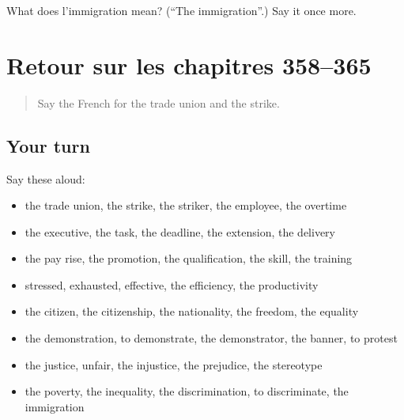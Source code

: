 \begin{tcolorbox}[breakable,colback=teal!4,colframe=teal!35!black,title={Before you move on}]
What does l'immigration mean? (\textquotedblleft{}The immigration\textquotedblright{}.) Say it once more.
\end{tcolorbox}
\section[(dialogue)]{Retour sur les chapitres 358–365}

\label{lesson:FR-R365-revision-358-365}



\begin{quote}
Say the French for the trade union and the strike.
\end{quote}

\subsection*{Your turn}
Say these aloud:

\begin{itemize}
\raggedright
  \item the trade union, the strike, the striker, the employee, the overtime
  \item the executive, the task, the deadline, the extension, the delivery
  \item the pay rise, the promotion, the qualification, the skill, the training
  \item stressed, exhausted, effective, the efficiency, the productivity
  \item the citizen, the citizenship, the nationality, the freedom, the equality
  \item the demonstration, to demonstrate, the demonstrator, the banner, to protest
  \item the justice, unfair, the injustice, the prejudice, the stereotype
  \item the poverty, the inequality, the discrimination, to discriminate, the immigration
\end{itemize}

